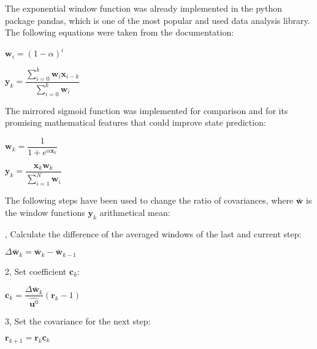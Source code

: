 \documentclass[class=article, crop=false]{standalone}
\begin{document}
The exponential window function was already implemented in the python package pandas, which is one of the most popular and used data analysis library. The following equations were taken from the documentation\footnotemark:


\vspace{0.5cm}

\begin{center}

$ \textbf{w}_i = (1 - \alpha)^i $

\vspace{0.5cm}
$ \textbf{y}_k = \dfrac{\sum_{i=0}^{k} \textbf{w}_i \textbf{x}_{i-k}}{ \sum_{i=0}^{k} \textbf{w}_i} $

\end{center}

\vspace{0.5cm}

The mirrored sigmoid function was implemented for comparison and for its promising mathematical features that could improve state prediction:

\vspace{0.5cm}

\begin{center}

$ \textbf{w}_k = \dfrac{ 1 }{ 1 + e^{\alpha \textbf{x}_k} } $ \\

\vspace{0.5cm}

$ \textbf{y}_k = \dfrac{\textbf{x}_k \textbf{w}_k}{ \sum_{i=1}^{N} \textbf{w}_i } $

\end{center}

\vspace{0.5cm}

The following steps have been used to change the ratio of covariances, where $ \bar{\textbf{w}} $ is the window functions $ \textbf{y}_k $ arithmetical mean:
\vspace{0.5cm}

, Calculate the difference of the averaged windows of the last and current step:
\begin{center}
$ \Delta \bar{\textbf{w}}_k = \bar{\textbf{w}}_k - \bar{\textbf{w}}_{k-1} $
\end{center}
\vspace{0.5cm}
2, Set coefficient $ \textbf{c}_k $:
\begin{center}
$ \textbf{c}_k = \dfrac{\Delta \bar{\textbf{w}}_k}{\hat{\textbf{u}^0}} (\textbf{r}_k - 1) $
\end{center}
\vspace{0.5cm}
3, Set the covariance for the next step:
\begin{center}
$ \textbf{r}_{k+1} = \textbf{r}_{k} \textbf{c}_k $
\end{center}
\end{document}
